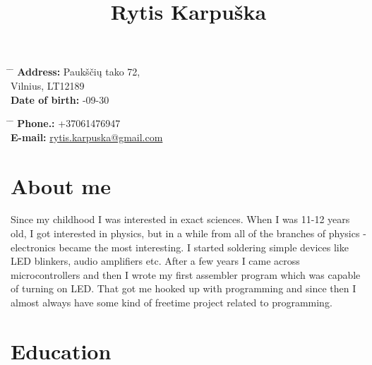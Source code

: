 \documentclass[12]{article}
\begin{document}
\title{Rytis Karpuška}


\parbox{0.5\textwidth}{ %
\begin{tabbing} %
\hspace{3cm} \= \hspace{4cm} \= \kill %
{\bf Address:} \> Paukščių tako 72,\\ %
\> Vilnius, LT12189\\ %
{\bf Date of birth:} -09-30\\ %
\end{tabbing}}
\hfill %
\parbox{0.5\textwidth}{ %
\begin{tabbing} %
\hspace{3cm} \= \hspace{4cm} \= \kill %
{\bf Phone.:} \> +37061476947 \\ %
{\bf E-mail:} \> \href{mailto:rytis.karpuska@gmail.com}{rytis.karpuska@gmail.com} \\ %
\end{tabbing}}

\section{About me}

Since my childhood I was interested in exact sciences.
When I was 11-12 years old, I got interested in physics, but in a while from all of the branches of physics - electronics became the most interesting.
I started soldering simple devices like LED blinkers, audio amplifiers etc.
After a few years I came across microcontrollers and then I wrote my first assembler program which was capable of turning on LED.
That got me hooked up with programming and since then I almost always have some kind of freetime project related to programming.

\section{Education}

\end{document}
